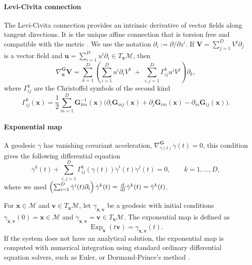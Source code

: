 \paragraph{Levi-Civita connection}
The Levi-Civita connection provides an intrinsic derivative of vector fields along tangent directions. It is the unique affine connection that is torsion free and compatible with the metric \citep{Lee2018}.
We use the notation $\partial_i := \partial/\partial z^i$. If $\boldsymbol{V}=\sum_{j=1}^D V^j\partial_j$ is a vector field and $\boldsymbol{u}=\sum_{i=1}^D u^i\partial_i\in T_{\boldsymbol{x}}\mathcal{M}$, then
\begin{equation*}
\nabla^{\mathbf{G}}_{\boldsymbol{u}}\boldsymbol{V}
=
\sum_{k=1}^D
\left(
\sum_{i=1}^D u^i \partial_i V^k
\;+\;
\sum_{i,j=1}^D \Gamma_{ij}^{k} u^i V^j
\right)\partial_k,
\end{equation*}
where $\Gamma^k_{ij}$ are the Christoffel symbols of the second kind 
\begin{equation} \label{eq:christoffel_symbols}
\Gamma^k_{ij}(\boldsymbol{x})
=
\frac{1}{2}\sum_{m=1}^D \mathbf{G}^{-1}_{km}(\boldsymbol{x})
\bigl(
\partial_i \mathbf{G}_{mj}(\boldsymbol{x})
+
\partial_j \mathbf{G}_{im}(\boldsymbol{x})
- \partial_m \mathbf{G}_{ij}(\boldsymbol{x})
\bigr). 
\end{equation}


\paragraph{Exponential map} 
A geodesic $\gamma$ has vanishing covariant acceleration, $\nabla^{\mathbf{G}}_{\dot{\gamma}(t)}\dot{\gamma}(t)=0$, this condition gives the following differential equation
\begin{equation}
\ddot{\gamma}^{k}(t)
+
\sum_{i,j=1}^{D}\Gamma_{ij}^{k}(\gamma(t))\dot{\gamma}^{i}(t)\dot{\gamma}^{j}(t)
=0,
\qquad k=1,\dots,D,
\label{eq:geodesic_equations}
\end{equation}
where we used 
$ \left( \sum_{i=1}^D \dot{\gamma}^{i}(t) \partial_i \right) \dot\gamma^k(t) = \dv[]{}{t} \dot\gamma^k(t) = \ddot{\gamma}^{k}(t)$.

For $\boldsymbol{x}\in\mathcal{M}$ and $\boldsymbol{v}\in T_{\boldsymbol{x}}\mathcal{M}$, let $\gamma_{\boldsymbol{x}, \boldsymbol{v}}$ be a geodesic with initial conditions $\gamma_{\boldsymbol{x}, \boldsymbol{v}}(0) = \boldsymbol{x}\in \mathcal{M}$ and $\dot \gamma_{\boldsymbol{x}, \boldsymbol{v}} =\boldsymbol{v}\in T_{\boldsymbol{x}}\mathcal{M}$. The exponential map is defined as 
\begin{equation*}
 \operatorname{Exp}_{\boldsymbol{x}}(t\boldsymbol{v}) = \gamma_{\boldsymbol{x}, \boldsymbol{v}}(t).
\end{equation*}
If the system does not have an analytical solution, the  exponential map is computed with numerical integration using standard ordinary differential equation solvers, such as Euler, or Dormand-Prince's method \citep{kidger2022neural}.

